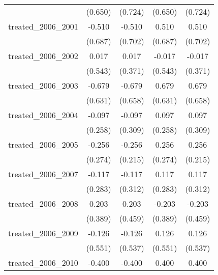 {\begin{tabular}{l*{4}{c}}
            &     (0.650)         &     (0.724)         &     (0.650)         &     (0.724)         \\
[1em]
treated\_2006\_2001&      -0.510         &      -0.510         &       0.510         &       0.510         \\
            &     (0.687)         &     (0.702)         &     (0.687)         &     (0.702)         \\
[1em]
treated\_2006\_2002&       0.017         &       0.017         &      -0.017         &      -0.017         \\
            &     (0.543)         &     (0.371)         &     (0.543)         &     (0.371)         \\
[1em]
treated\_2006\_2003&      -0.679         &      -0.679         &       0.679         &       0.679         \\
            &     (0.631)         &     (0.658)         &     (0.631)         &     (0.658)         \\
[1em]
treated\_2006\_2004&      -0.097         &      -0.097         &       0.097         &       0.097         \\
            &     (0.258)         &     (0.309)         &     (0.258)         &     (0.309)         \\
[1em]
treated\_2006\_2005&      -0.256         &      -0.256         &       0.256         &       0.256         \\
            &     (0.274)         &     (0.215)         &     (0.274)         &     (0.215)         \\
[1em]
treated\_2006\_2007&      -0.117         &      -0.117         &       0.117         &       0.117         \\
            &     (0.283)         &     (0.312)         &     (0.283)         &     (0.312)         \\
[1em]
treated\_2006\_2008&       0.203         &       0.203         &      -0.203         &      -0.203         \\
            &     (0.389)         &     (0.459)         &     (0.389)         &     (0.459)         \\
[1em]
treated\_2006\_2009&      -0.126         &      -0.126         &       0.126         &       0.126         \\
            &     (0.551)         &     (0.537)         &     (0.551)         &     (0.537)         \\
[1em]
treated\_2006\_2010&      -0.400         &      -0.400         &       0.400         &       0.400         \\

\end{tabular}}
